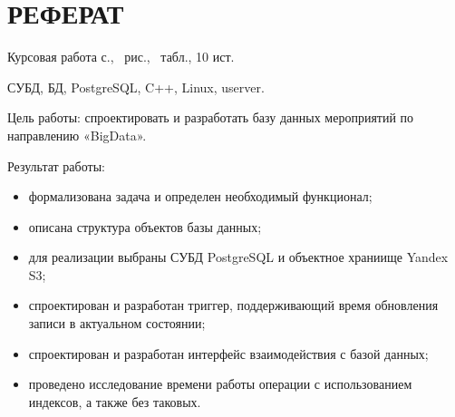 
\setcounter{page}{3}
\section*{РЕФЕРАТ}

Курсовая работа \pageref{LastPage} с., \totalfigures\ рис., \totaltables\ табл., 10 ист.

СУБД, БД, PostgreSQL, C++, Linux, userver.

Цель работы: спроектировать и разработать базу данных мероприятий по направлению «BigData».

Результат работы: 
\begin{itemize}[label=---]
	\item формализована задача и определен необходимый функционал;
	\item описана структура объектов базы данных;
	\item для реализации выбраны СУБД PostgreSQL и объектное храниище Yandex S3;
	\item спроектирован и разработан триггер, поддерживающий время обновления записи в актуальном состоянии;
	\item спроектирован и разработан интерфейс взаимодействия с базой данных;
	\item проведено исследование времени работы операции с использованием индексов, а также без таковых.
\end{itemize}

\pagebreak
